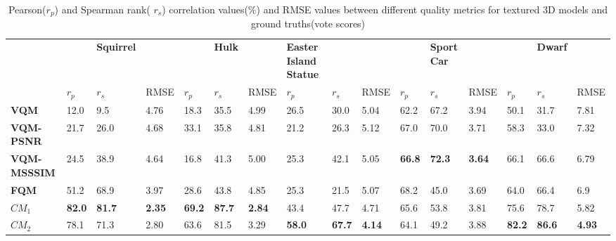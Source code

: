 \begin{table}[]
\centering
\caption{Pearson($r_p$) and Spearman rank( $r_s$) correlation values(\%) and RMSE values between different quality metrics for textured 3D models and ground truths(vote scores)}
\label{my-label}
\begin{tabular}{llllllllllllllll}
                    &      & \textbf{Squirrel} & \textbf{} & \textbf{} & \textbf{Hulk} & \textbf{} & \textbf{Easter Island Statue} & \textbf{} & \textbf{} & \textbf{} & \textbf{Sport Car} & \textbf{} & \textbf{} & \textbf{Dwarf} &      \\
                     & $r_p$                & $r_s$           & RMSE & $r_p$                & $r_s$            & RMSE & $r_p$                & $r_s$            & RMSE &$r_p$                & $r_s$            & RMSE      & $r_p$                & $r_s$             & RMSE \\
\textbf{VQM}        & 12.0          & 9.5               & 4.76          & 18.3          & 35.5          & 4.99          & 26.5          & 30.0                          & 5.04          & 62.2          & 67.2               & 3.94          & 50.1          & 31.7           & 7.81          \\
\textbf{VQM-PSNR}   & 21.7          & 26.0              & 4.68          & 33.1          & 35.8          & 4.81          & 21.2          & 26.3                          & 5.12          & 67.0          & 70.0               & 3.71          & 58.3          & 33.0           & 7.32          \\
\textbf{VQM-MSSSIM} & 24.5          & 38.9              & 4.64          & 16.8          & 41.3          & 5.00          & 25.3          & 42.1                          & 5.05          & \textbf{66.8} & \textbf{72.3}      & \textbf{3.64} & 66.1          & 66.6           & 6.79          \\
\textbf{FQM}        & 51.2          & 68.9              & 3.97          & 28.6          & 43.8          & 4.85          & 25.3          & 21.5                          & 5.07          & 68.2          & 45.0               & 3.69          & 64.0          & 66.4           & 6.9           \\
$CM_1$                 & \textbf{82.0} & \textbf{81.7}     & \textbf{2.35} & \textbf{69.2} & \textbf{87.7} & \textbf{2.84} & 43.4          & 47.7                          & 4.71          & 65.6          & 53.8               & 3.81          & 75.6          & 78.7           & 5.82          \\
$CM_2$                 & 78.1          & 71.3              & 2.80          & 63.6          & 81.5          & 3.29          & \textbf{58.0} & \textbf{67.7}                 & \textbf{4.14} & 64.1          & 49.2               & 3.88          & \textbf{82.2} & \textbf{86.6}  & \textbf{4.93}
\end{tabular}
\end{table}
